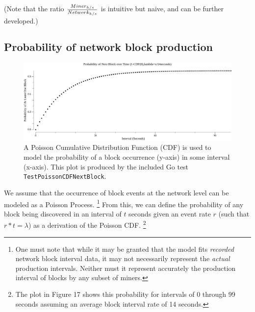 \documentclass[11pt]{article}
\theoremstyle{plain}
\begin{document}
{(Note that the ratio $\frac{Miner_{h/s}}{Network_{h/s}}$ is intuitive but
naive, and can be further developed.)

\subsection{\normalsize{Probability of network block production}}

\begin{figure}[htp]
    \label{go-block-step-cdf-interval}
    \centering
    \includegraphics[width=1.0\textwidth]{go-block-step/out/vis_poisson_cdf_next_in_interval.png}
    \caption{
        A Poisson Cumulative Distribution Function (CDF) is used to model the probability of a block
        occurrence (y-axis) in some interval (x-axis).
        This plot is produced by the included Go test \texttt{TestPoissonCDFNextBlock}.
    }
\end{figure}

We assume that the occurrence of block events at the network level can be
modeled as a Poisson Process.\nolinebreak
\footnote{
One must note that while it may be granted that the model fits \emph{recorded}
network block interval data, it may not necessarily represent the \emph{actual}
production intervals. Neither must it represent accurately the production
interval of blocks by any subset of miners.
}
From this, we can define the probability of any block being discovered in an
interval of $t$ seconds given an event rate $r$ (such that $r * t = \lambda$)
as a derivation of the Poisson CDF.
\footnote{
    The plot in Figure 17 shows this probability for intervals of 0 through 99
    seconds assuming an average block interval rate of 14 seconds.
}

}
\end{document}
